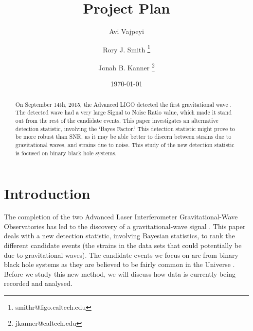 \documentclass{article}
\title{Project Plan} %
\author[1]{Avi Vajpeyi }
\author[2]{Rory J. Smith \thanks{smith\textunderscore r@ligo.caltech.edu}}
\author[2]{Jonah B. Kanner \thanks{jkanner@caltech.edu}}
\affil[1]{The College of Wooster, Wooster, OH 44691, USA}
\affil[2]{LIGO Laboratory, California Institute of Technology, Pasadena, CA 91125, USA}
\date{\today} %
\begin{document}
\maketitle %






 \begin{abstract}
On September 14th, 2015, the Advanced LIGO detected the first gravitational wave \cite{DetectionPaper}. The detected wave had a very large Signal to Noise Ratio value, which made it stand out from the rest of the candidate events. This paper investigates an alternative detection statistic, involving the `Bayes Factor.' This detection statistic might prove to be more robust than SNR, as it may be able better to discern between strains due to gravitational waves, and strains due to noise. This study of the new detection statistic is focused on binary black hole systems. 


\end{abstract}


\section{Introduction} \label{section:intro}




 \indent The completion of the two Advanced Laser Interferometer Gravitational-Wave Observatories has led to the discovery of a gravitational-wave signal \cite{DetectionPaper}. This paper deals with a new detection statistic, involving Bayesian statistics, to rank the different candidate events (the strains in the data sets that could potentially be due to gravitational waves). The candidate events we focus on are from binary black hole systems as they are believed to be fairly common in the Universe \cite{NumDetections}. Before we study this new method, we will discuss how data is currently being recorded and analysed.\\
 
\end{document}

